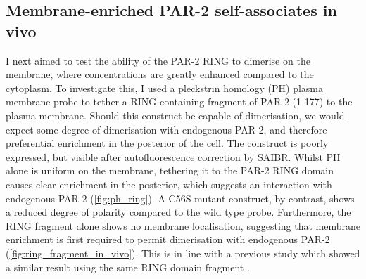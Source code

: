 \documentclass[12pt]{"report"}
\begin{document}
\subsection{Membrane-enriched PAR-2 self-associates in vivo}

I next aimed to test the ability of the PAR-2 RING to dimerise on the membrane, where concentrations are greatly enhanced compared to the cytoplasm. To investigate this, I used a pleckstrin homology (PH) plasma membrane probe to tether a RING-containing fragment of PAR-2 (1-177) to the plasma membrane. Should this construct be capable of dimerisation, we would expect some degree of dimerisation with endogenous PAR-2, and therefore preferential enrichment in the posterior of the cell. The construct is poorly expressed, but visible after autofluorescence correction by SAIBR. Whilst PH alone is uniform on the membrane, tethering it to the PAR-2 RING domain causes clear enrichment in the posterior, which suggests an interaction with endogenous PAR-2 (\cref{fig:ph_ring}). A C56S mutant construct, by contrast, shows a reduced degree of polarity compared to the wild type probe. Furthermore, the RING fragment alone shows no membrane localisation, suggesting that membrane enrichment is first required to permit dimerisation with endogenous PAR-2 (\cref{fig:ring_fragment_in_vivo}). This is in line with a previous study which showed a similar result using the same RING domain fragment \citep{Hao2006}.\\
\end{document}
